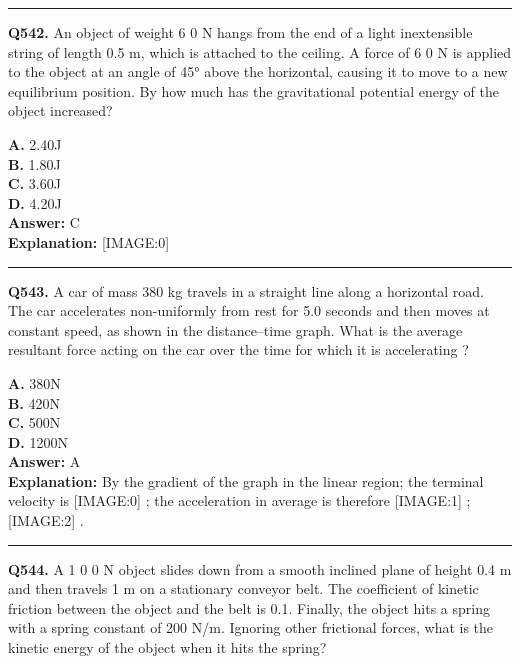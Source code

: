 \documentclass[12pt]{article}
\begin{document}
\hrule
\vspace{1em}


\noindent
\textbf{Q542.} An object of weight
6
0 N hangs from the end of a light inextensible string of length 0.5 m, which is attached to the ceiling. A force of
6
0 N is applied to the object at an angle of 45° above the horizontal, causing it to move to a new equilibrium position. By how much has the gravitational potential energy of the object increased?



\textbf{A.} 2.40J \\
\textbf{B.} 1.80J \\
\textbf{C.} 3.60J \\
\textbf{D.} 4.20J \\

\textbf{Answer:} C \\
\textbf{Explanation:} [IMAGE:0]

\hrule
\vspace{1em}


\noindent
\textbf{Q543.} A car of mass 380 kg travels in a straight line along a horizontal road.
The car accelerates non-uniformly from rest for 5.0 seconds and then moves at constant speed, as shown in the distance–time graph.
What is the average resultant force acting on the car over the time for which it is accelerating
?



\textbf{A.} 380N \\
\textbf{B.} 420N \\
\textbf{C.} 500N \\
\textbf{D.} 1200N \\

\textbf{Answer:} A \\
\textbf{Explanation:} By the gradient of the graph in the linear region; the terminal velocity is
[IMAGE:0]
; the acceleration in average is therefore
[IMAGE:1]
;
[IMAGE:2]
.

\hrule
\vspace{1em}


\noindent
\textbf{Q544.} A
1
0
0
N object slides down from a smooth inclined plane of height 0.4 m and then travels 1 m on a stationary conveyor belt. The coefficient of kinetic friction between the object and the belt is 0.1. Finally, the object hits a spring with a spring constant of 200 N/m. Ignoring other frictional forces, what is the kinetic energy of the object when it hits the spring?
\end{document}
